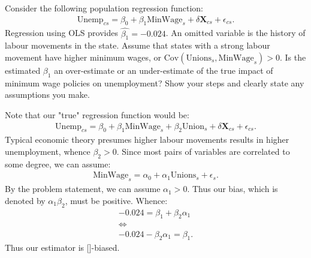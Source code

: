 \documentclass[11pt,twoside,openany]{memoir}
\begin{document}
        \begin{question}
            Consider the following population regression function:
                \begin{equation*}
                \begin{split}
                    \text{Unemp}_{cs} = \beta_0 + \beta_1 \text{MinWage}_{s} + \delta \mathbf{X}_{cs} + \epsilon_{cs}.
                \end{split}
                \end{equation*}
            Regression using OLS provides $\widehat{\beta_1} = -0.024$. An omitted variable is the history of labour movements in the state. Assume that states with a strong labour movement have higher minimum wages, or $\text{Cov}(\text{Unions}_s,\text{MinWage}_s)>0$. Is the estimated $\beta_1$ an over-estimate or an under-estimate of the true impact of minimum wage policies on unemployment? Show your steps and clearly state any assumptions you make.
        \end{question}
            \begin{solution}
                Note that our "true" regression function would be:
                    \begin{equation*}
                    \begin{split}
                        \text{Unemp}_{cs} = \beta_0 + \beta_1 \text{MinWage}_{s} + \beta_2 \text{Union}_s + \delta \mathbf{X}_{cs} + \epsilon_{cs}.
                    \end{split}
                    \end{equation*}
                Typical economic theory presumes higher labour movements results in higher unemployment, whence $\beta_2 > 0$. Since most pairs of variables are correlated to some degree, we can assume:
                    \begin{equation*}
                    \begin{split}
                        \text{MinWage}_s = \alpha_0 + \alpha_1 \text{Unions}_s + \epsilon_s.
                    \end{split}
                    \end{equation*}
                By the problem statement, we can assume $\alpha_1 > 0$. Thus our bias, which is denoted by $\alpha_1 \beta_2$, must be positive. Whence:
                    \begin{equation*}
                    \begin{split}
                        -0.024 = \beta_1 + \beta_2 \alpha_1 \\
                        \iff \\
                        -0.024 - \beta_2 \alpha_1 = \beta_1.
                    \end{split}
                    \end{equation*}
                Thus our estimator is []-biased.
            \end{solution}
\end{document}
